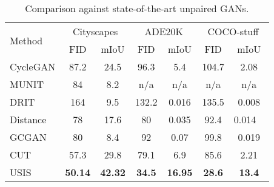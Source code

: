 \documentclass{article}
\begin{document}
\begin{table}




	\setlength{\tabcolsep}{0.2em}
	\renewcommand{\arraystretch}{0.95}
	\centering
	
	\begin{tabular}{l|cc|cc|cc}
    	\multirow{2}{*}{\normalsize{} Method } & \multicolumn{2}{c|}{\normalsize{} Cityscapes} &  \multicolumn{2}{c|}{\normalsize{} ADE20K} & \multicolumn{2}{c}{\normalsize{} COCO-stuff} 
    	\tabularnewline
    	  &  \normalsize{} FID  & \normalsize{} mIoU &  \normalsize{} FID  & \normalsize{} mIoU &  \normalsize{} FID  & \normalsize{} mIoU \tabularnewline
    	
    	\hline 
    	
    	{\small{CycleGAN} \cite{zhu2017unpaired} } &   \normalsize{87.2} & \normalsize{24.5}  &  \normalsize{96.3} & \normalsize{5.4} &  \normalsize{104.7} & \normalsize{2.08} \tabularnewline
    	
    	
    	
    	{\small{MUNIT} \cite{huang2018multimodal}  } &   \normalsize{84} & \normalsize{8.2} &   \normalsize{n/a} & \normalsize{n/a}  &  \normalsize{n/a} & \normalsize{n/a} \tabularnewline
    	
    	
    	{\small{DRIT} \cite{lee2018diverse}  } &  \normalsize{164} & \normalsize{9.5} &  \normalsize{132.2} & \normalsize{0.016} &  \normalsize{135.5} & \normalsize{0.008} \tabularnewline
		
				
    	 {\small{Distance} \cite{benaim2017one}  } &   \normalsize{78} & \normalsize{17.6} &  \normalsize{80} & \normalsize{0.035} &  \normalsize{92.4} & \normalsize{0.014 } \ \tabularnewline
    		
    		
    		
    	{\small{GCGAN} \cite{fu2019geometry} } &   \normalsize{80} & \normalsize{8.4} &   \normalsize{92} & \normalsize{0.07} &  \normalsize{99.8} & \normalsize{0.019} \tabularnewline
    		
    	
    	\small{CUT} \cite{park2020cut} &   
    	\normalsize{57.3} & \normalsize{29.8} &  \normalsize{79.1}  &\normalsize{6.9} &  \normalsize{85.6} & \normalsize{2.21}  \tabularnewline


    	 \hline
    	
    	\small{} USIS	&   \normalsize{\textbf{50.14}} & \normalsize{\textbf{42.32}} & \normalsize{\textbf{34.5}} & \normalsize{\textbf{16.95}} & \normalsize{\textbf{28.6}} & \normalsize{\textbf{13.4}} \tabularnewline
		
		\end{tabular}
	\caption{Comparison against state-of-the-art unpaired GANs.}
	\label{table:comp_with_sota}
	\vspace{-1.5em}
\end{table}
\end{document}
